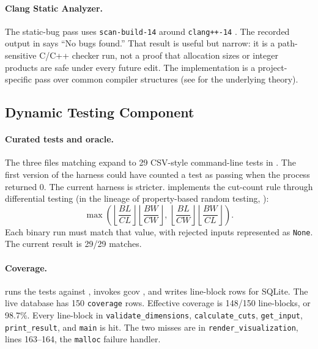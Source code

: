 \documentclass[11pt,twocolumn]{article}
\begin{document}
\paragraph{Clang Static Analyzer.}
The static-bug pass uses \texttt{scan-build-14} around \texttt{clang++-14}
\cite{coverity}.
The recorded output in  says ``No bugs
found.'' That result is useful but narrow: it is a path-sensitive C/C++ checker
run, not a proof that allocation sizes or integer products are safe under every
future edit. The implementation is a project-specific pass over
common compiler structures (see \cite{aho,nielson} for the underlying theory).

\subsection{Dynamic Testing Component}

\paragraph{Curated tests and oracle.}
The three files matching  expand to 29
CSV-style command-line tests in . The first
version of the harness could have counted a test as passing when the process
returned 0. The current harness is stricter. 
implements the cut-count rule through differential testing \cite{mckeeman}
(in the lineage of property-based random testing, \cite{quickcheck}):
\[
\max\left(
\left\lfloor \frac{BL}{CL} \right\rfloor
\left\lfloor \frac{BW}{CW} \right\rfloor,\,
\left\lfloor \frac{BL}{CW} \right\rfloor
\left\lfloor \frac{BW}{CL} \right\rfloor
\right).
\]
Each binary run must match that value, with rejected inputs represented as
\texttt{None}. The current result is 29/29 matches.

\paragraph{Coverage.}
 runs the tests against
, invokes gcov \cite{gcov}, and writes line-block rows for
SQLite. The live database has 150 \texttt{coverage} rows. Effective coverage is
148/150 line-blocks, or 98.7\%. Every line-block in
\texttt{validate\_dimensions}, \texttt{calculate\_cuts}, \texttt{get\_input},
\texttt{print\_result}, and \texttt{main} is hit. The two misses are in
\texttt{render\_visualization}, lines 163--164, the \texttt{malloc} failure
handler.
\end{document}
